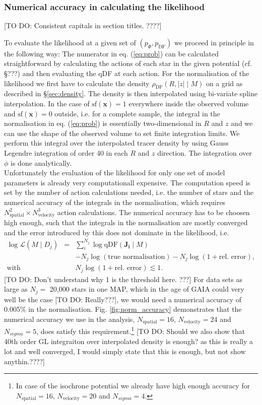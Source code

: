 \documentclass[12pt,preprint]{aastex}
\newcommand{\vect}[1]{\boldsymbol{#1}} %
\begin{document}
\subsubsection{Numerical accuracy in calculating the likelihood} \label{sec:numaccuracynormalisation}
[TO DO: Consistent capitals in section titles. ????]

To evaluate the likelihood at a given set of $(p_\Phi,p_\text{DF})$ we proceed in principle in the following way: The numerator in eq. (\ref{eq:prob}) can be calculated straightforward by calculating the actions of each star in the given potential (cf. \S ???) and then evaluating the qDF at each action. For the normalisation of the likelihood we first have to calculate the density $\rho_\text{DF}(R,|z| \mid M)$ on a grid as described in \S\ref{sec:density}. The density is then interpolated using bi-variate spline interpolation. In the case of $\text{sf}(\vect{x})=1$ everywhere inside the observed volume and $\text{sf}(\vect{x})=0$ outside, i.e. for a complete sample, the integral in the normalisation in eq. (\ref{eq:prob}) is essentially two-dimensional in $R$ and $z$ and we can use the shape of the observed volume to set finite integration limits. We perform this integral over the interpolated tracer density by using Gauss Legendre integration of order 40 in each $R$ and $z$ direction. The integration over $\phi$ is done analytically.
\\Unfortunately the evaluation of the likelihood for only one set of model parameters is already very computationall expensive. The computation speed is set by the number of action calculations needed, i.e. the number of stars and the numerical accuracy of the integrals in the normalisation, which requires $N_\text{spatial}^2 \times N_\text{velocity}^3$ action calculations. The numerical accuracy has to be choosen high enough, such that the integrals in the normalisation are mostly converged and the error introduced by this does not dominate in the likelihood, i.e.
\begin{eqnarray}
\log \mathscr{L}(M \mid D_j) &=& \sum_i^{N_j} \log \text{qDF}(\vect{J_i} \mid M) \nonumber\\
& & -N_j \log(\text{true normalisation}) - N_j \log (1 + \text{rel. error}),\label{eq:relerrlikelihood}\\
 \text{with }  & &N_j \log (1 + \text{rel. error}) \lesssim 1.\nonumber
\end{eqnarray}
[TO DO: Don't understand why 1 is the threshold here. ???]
For data sets as large as $N_j =$ 20,000 stars in one MAP, which in the age of GAIA could very well be the case [TO DO: Really???], we would need a numerical accuracy of 0.005\% in the normalisation. Fig. \ref{fig:norm_accuracy} demonstrates that the numerical accuracy we use in the analysis, $N_\text{spatial}=16$, $N_\text{velocity}=24$ and $N_{sigma}=5$, does satisfy this requirement.\footnote{In case of the isochrone potential we already have high enough accuracy for $N_\text{spatial}=16$, $N_\text{velocity}=20$ and $N_{sigma}=4$.} [TO DO: Should we also show that 40th order GL integraiton over interpolated density is enough? as this is really a lot and well converged, I would simply state that this is enough, but not show anythin.????]
\end{document}
